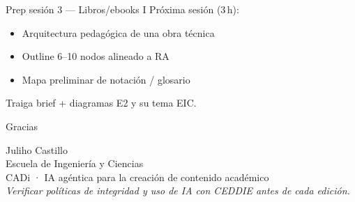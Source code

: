 \documentclass[aspectratio=169,11pt]{beamer}
\begin{document}
\begin{frame}{Prep sesión 3 --- Libros/ebooks I}
Próxima sesión (3\,h):
\begin{itemize}
\item Arquitectura pedagógica de una obra técnica
\item Outline 6--10 nodos alineado a RA
\item Mapa preliminar de notación / glosario
\end{itemize}
Traiga brief + diagramas E2 y su tema EIC.
\end{frame}

\begin{frame}{Gracias}
\begin{center}
{\Large Juliho Castillo}\\[0.5em]
Escuela de Ingeniería y Ciencias\\[1em]
CADi · IA agéntica para la creación de contenido académico\\[1.5em]
{\small \emph{Verificar políticas de integridad y uso de IA con CEDDIE antes de cada edición.}}
\end{center}
\end{frame}
\end{document}
